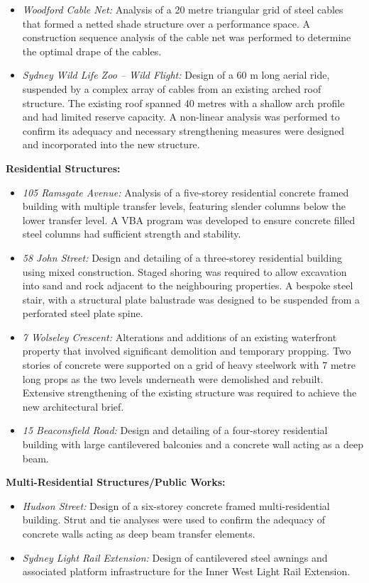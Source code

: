 \begin{cventries}
{\begin{cvitems}
\begin{itemize}
            \item \emph{Woodford Cable Net:} Analysis of a 20 metre triangular grid of steel cables that formed a netted shade structure over a performance space. A construction sequence analysis of the cable net was performed to determine the optimal drape of the cables.
            \item \emph{Sydney Wild Life Zoo – Wild Flight:} Design of a 60 m long aerial ride, suspended by a complex array of cables from an existing arched roof structure. The existing roof spanned 40 metres with a shallow arch profile and had limited reserve capacity. A non-linear analysis was performed to confirm its adequacy and necessary strengthening measures were designed and incorporated into the new structure.
          \end{itemize}
          \textbf{Residential Structures:}
          \begin{itemize}
            \item \emph{105 Ramsgate Avenue:} Analysis of a five-storey residential concrete
            framed building with multiple transfer levels, featuring slender columns below the lower transfer level. A VBA program was developed to ensure concrete filled steel columns had sufficient strength and stability.
            \item \emph{58 John Street:} Design and detailing of a three-storey residential building using mixed construction. Staged shoring was required to allow excavation into sand and rock adjacent to the neighbouring properties. A bespoke steel stair, with a structural plate balustrade was designed to be suspended from a perforated steel plate spine.
            \item \emph{7 Wolseley Crescent:} Alterations and additions of an existing waterfront property that involved significant demolition and temporary propping. Two stories of concrete were supported on a grid of heavy steelwork with 7 metre long props as the two levels underneath were demolished and rebuilt. Extensive strengthening of the existing structure was required to achieve the new architectural brief.
            \item \emph{15 Beaconsfield Road:} Design and detailing of a four-storey residential building with large cantilevered balconies and a concrete wall acting as a deep beam.
          \end{itemize}
          \textbf{Multi-Residential Structures/Public Works:}
          \begin{itemize}
            \item \emph{Hudson Street:} Design of a six-storey concrete framed multi-residential
            building. Strut and tie analyses were used to confirm the adequacy of
            concrete walls acting as deep beam transfer elements.
            \item \emph{Sydney Light Rail Extension:} Design of cantilevered steel awnings and
            associated platform infrastructure for the Inner West Light Rail Extension.
          \end{itemize}
      \end{cvitems}
    }


\end{cventries}
